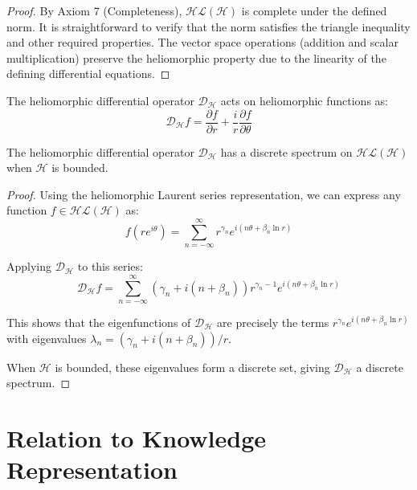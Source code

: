 \begin{proof}
By Axiom 7 (Completeness), $\mathcal{HL}(\mathcal{H})$ is complete under the defined norm. It is straightforward to verify that the norm satisfies the triangle inequality and other required properties. The vector space operations (addition and scalar multiplication) preserve the heliomorphic property due to the linearity of the defining differential equations.
\end{proof}

\begin{definition}
The heliomorphic differential operator $\mathcal{D}_{\mathcal{H}}$ acts on heliomorphic functions as:
\begin{equation}
\mathcal{D}_{\mathcal{H}}f = \frac{\partial f}{\partial r} + \frac{i}{r}\frac{\partial f}{\partial \theta}
\end{equation}
\end{definition}

\begin{theorem}
The heliomorphic differential operator $\mathcal{D}_{\mathcal{H}}$ has a discrete spectrum on $\mathcal{HL}(\mathcal{H})$ when $\mathcal{H}$ is bounded.
\end{theorem}

\begin{proof}
Using the heliomorphic Laurent series representation, we can express any function $f \in \mathcal{HL}(\mathcal{H})$ as:
\begin{equation}
f(re^{i\theta}) = \sum_{n=-\infty}^{\infty} r^{\gamma_n} e^{i(n\theta + \beta_n \ln r)}
\end{equation}

Applying $\mathcal{D}_{\mathcal{H}}$ to this series:
\begin{equation}
\mathcal{D}_{\mathcal{H}}f = \sum_{n=-\infty}^{\infty} (\gamma_n + i(n + \beta_n))r^{\gamma_n-1} e^{i(n\theta + \beta_n \ln r)}
\end{equation}

This shows that the eigenfunctions of $\mathcal{D}_{\mathcal{H}}$ are precisely the terms $r^{\gamma_n} e^{i(n\theta + \beta_n \ln r)}$ with eigenvalues $\lambda_n = (\gamma_n + i(n + \beta_n))/r$.

When $\mathcal{H}$ is bounded, these eigenvalues form a discrete set, giving $\mathcal{D}_{\mathcal{H}}$ a discrete spectrum.
\end{proof}

\section{Relation to Knowledge Representation}

